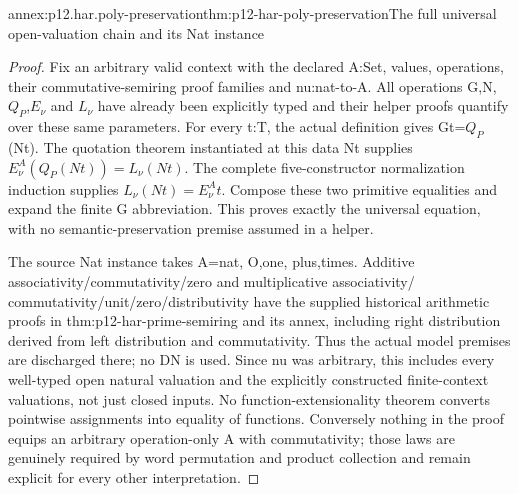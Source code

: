 \begin{annexitem}{annex:p12.har.poly-preservation}{thm:p12-har-poly-preservation}{The full universal open-valuation chain and its Nat instance}
\begin{proof}
Fix an arbitrary valid context with the declared A:Set, values,
operations, their commutative-semiring proof families and nu:nat-to-A.
All operations G,N,\(Q_P\),\(E_\nu\) and \(L_\nu\) have already been explicitly
typed and their helper proofs quantify over these same parameters.
For every t:T, the actual definition gives Gt=\(Q_P\)(Nt). The quotation
theorem instantiated at this data Nt supplies
\(E_\nu^A(Q_P(Nt))=L_\nu(Nt)\).
The complete five-constructor normalization induction supplies
\(L_\nu(Nt)=E_\nu^A t\). Compose these two primitive equalities
and expand the finite G abbreviation. This proves exactly the universal
equation, with no semantic-preservation premise assumed in a helper.

The source Nat instance takes A=nat, O,one, plus,times. Additive
associativity/commutativity/zero and multiplicative associativity/
commutativity/unit/zero/distributivity have the supplied historical
arithmetic proofs in thm:p12-har-prime-semiring and its annex, including
right distribution derived from left distribution and commutativity.
Thus the actual model premises are discharged there; no DN is used.
Since nu was arbitrary, this includes every well-typed open natural
valuation and the explicitly constructed finite-context valuations,
not just closed inputs. No function-extensionality theorem converts
pointwise assignments into equality of functions. Conversely nothing
in the proof equips an arbitrary operation-only A with commutativity;
those laws are genuinely required by word permutation and product
collection and remain explicit for every other interpretation.
\end{proof}
\end{annexitem}

